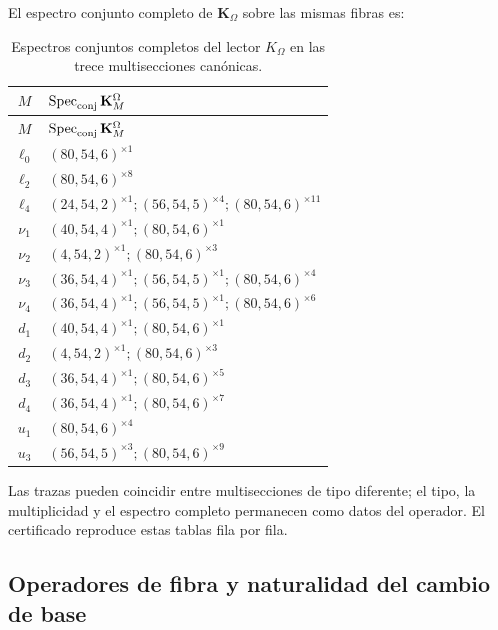 El espectro conjunto completo de \(\mathbf K_\Omega\) sobre las mismas fibras es:

\begingroup\footnotesize
\begin{longtable}{@{}c p{}@{}}
\caption{Espectros conjuntos completos del lector \(K_\Omega\) en las trece
multisecciones canónicas.}
\label{tab:espectros-komega-multisecciones-rev11}\\
\toprule
\(M\)&\(\operatorname{Spec}_{\rm conj}\mathbf K_M^\Omega\)\\
\midrule
\endfirsthead
\toprule
\(M\)&\(\operatorname{Spec}_{\rm conj}\mathbf K_M^\Omega\)\\
\midrule
\endhead
\(\ell_0\)&\((80,54,6)^{\times1}\)\\
\(\ell_2\)&\((80,54,6)^{\times8}\)\\
\(\ell_4\)&\((24,54,2)^{\times1};(56,54,5)^{\times4};(80,54,6)^{\times11}\)\\
\(\nu_1\)&\((40,54,4)^{\times1};(80,54,6)^{\times1}\)\\
\(\nu_2\)&\((4,54,2)^{\times1};(80,54,6)^{\times3}\)\\
\(\nu_3\)&\((36,54,4)^{\times1};(56,54,5)^{\times1};(80,54,6)^{\times4}\)\\
\(\nu_4\)&\((36,54,4)^{\times1};(56,54,5)^{\times1};(80,54,6)^{\times6}\)\\
\(d_1\)&\((40,54,4)^{\times1};(80,54,6)^{\times1}\)\\
\(d_2\)&\((4,54,2)^{\times1};(80,54,6)^{\times3}\)\\
\(d_3\)&\((36,54,4)^{\times1};(80,54,6)^{\times5}\)\\
\(d_4\)&\((36,54,4)^{\times1};(80,54,6)^{\times7}\)\\
\(u_1\)&\((80,54,6)^{\times4}\)\\
\(u_3\)&\((56,54,5)^{\times3};(80,54,6)^{\times9}\)\\
\bottomrule
\end{longtable}
\endgroup

Las trazas pueden coincidir entre multisecciones de tipo diferente; el tipo,
la multiplicidad y el espectro completo permanecen como datos del operador.
El certificado reproduce estas tablas fila por fila.

\subsection{Operadores de fibra y naturalidad del cambio de base}

